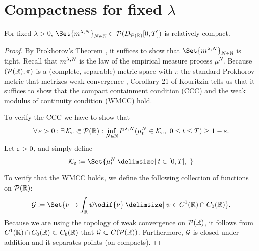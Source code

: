 \section{Compactness for fixed \texorpdfstring{\(\lambda\)}{lambda}}

\begin{theorem}
  For fixed \(\lambda > 0\), \(\Set{ \lawmu^{\lambda, N} }_{N\in\bN} \subset \cP(D_{\cP(\potspace)}[0,T])\) is relatively compact.
\end{theorem}

\begin{proof}
  By Prokhorov's Theorem \cite[Theorem 5.1]{billingsleyConvergenceProbabilityMeasures1999}, it suffices to show that \(\Set{ \lawmu^{\lambda, N} }_{N\in\bN}\) is tight.
  Recall that \(m^{\lambda, N}\) is the law of the empirical measure process \(\mu^N\).
  Because \((\mathcal{P}(\mathbb{R}), \pi)\) is a (complete, separable) metric space with \(\pi\) the standard Prokhorov metric that metrizes weak convergence \cite[Theorem 6.8]{billingsleyConvergenceProbabilityMeasures1999}, Corollary 21 of Kouritzin \cite{kouritzinTightnessProbabilityMeasures2015} tells us that it suffices to show that the compact containment condition (CCC) and the weak modulus of continuity condition (WMCC) hold.

  To verify the CCC we have to show that
  \begin{equation}
    \forall \eps > 0 : \exists \cK_\eps \Subset \cP(\potspace) :
    \inf_{N\in\bN} P^{\lambda, N} (\mu_t^N \in \cK_\eps,\ 0 \leq t \leq T) \geq 1 - \eps.
  \end{equation}
  Let \(\varepsilon > 0\), and simply define
  \begin{equation}
    \cK_\eps \coloneqq \Set{ \mu_t^N \given t \in [0,T],\  }
  \end{equation}


  \bigskip

  To verify that the WMCC holds, we define the following collection of functions on \(\mathcal{P}(\mathbb{R})\):
  \begin{equation}
    \cG \coloneqq \Set{\nu \mapsto \int_\potspace \psi \odif{\nu} \given \psi \in C^1(\potspace) \cap C_0(\potspace)}.
  \end{equation}
  Because we are using the topology of weak convergence on \(\mathcal{P}(\mathbb{R})\), it follows from \(C^1(\mathbb{R}) \cap C_0(\mathbb{R}) \subset C_b(\mathbb{R})\) that \(\mathcal{G} \subset C(\mathcal{P}(\mathbb{R}))\).
  Furthermore, \(\mathcal{G}\) is closed under addition and it separates points (on compacts).


\end{proof}

